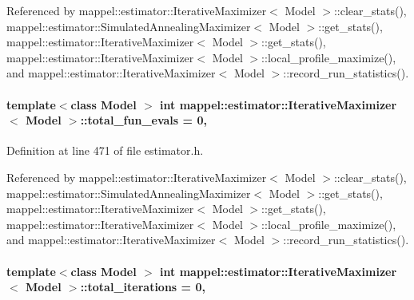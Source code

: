 Referenced by mappel\+::estimator\+::\+Iterative\+Maximizer$<$ Model $>$\+::clear\+\_\+stats(), mappel\+::estimator\+::\+Simulated\+Annealing\+Maximizer$<$ Model $>$\+::get\+\_\+stats(), mappel\+::estimator\+::\+Iterative\+Maximizer$<$ Model $>$\+::get\+\_\+stats(), mappel\+::estimator\+::\+Iterative\+Maximizer$<$ Model $>$\+::local\+\_\+profile\+\_\+maximize(), and mappel\+::estimator\+::\+Iterative\+Maximizer$<$ Model $>$\+::record\+\_\+run\+\_\+statistics().

\paragraph[{\texorpdfstring{total\+\_\+fun\+\_\+evals}{total_fun_evals}}]{\setlength{\rightskip}{0pt plus 5cm}template$<$class Model $>$ int {\bf mappel\+::estimator\+::\+Iterative\+Maximizer}$<$ Model $>$\+::total\+\_\+fun\+\_\+evals = 0\hspace{0.3cm}{\ttfamily [protected]}, {\ttfamily [inherited]}}\hypertarget{classmappel_1_1estimator_1_1IterativeMaximizer_aa4f49112ff3b145fa1096a7ac4d48af7}{}\label{classmappel_1_1estimator_1_1IterativeMaximizer_aa4f49112ff3b145fa1096a7ac4d48af7}


Definition at line 471 of file estimator.\+h.



Referenced by mappel\+::estimator\+::\+Iterative\+Maximizer$<$ Model $>$\+::clear\+\_\+stats(), mappel\+::estimator\+::\+Simulated\+Annealing\+Maximizer$<$ Model $>$\+::get\+\_\+stats(), mappel\+::estimator\+::\+Iterative\+Maximizer$<$ Model $>$\+::get\+\_\+stats(), mappel\+::estimator\+::\+Iterative\+Maximizer$<$ Model $>$\+::local\+\_\+profile\+\_\+maximize(), and mappel\+::estimator\+::\+Iterative\+Maximizer$<$ Model $>$\+::record\+\_\+run\+\_\+statistics().

\paragraph[{\texorpdfstring{total\+\_\+iterations}{total_iterations}}]{\setlength{\rightskip}{0pt plus 5cm}template$<$class Model $>$ int {\bf mappel\+::estimator\+::\+Iterative\+Maximizer}$<$ Model $>$\+::total\+\_\+iterations = 0\hspace{0.3cm}{\ttfamily [protected]}, {\ttfamily [inherited]}}\hypertarget{classmappel_1_1estimator_1_1IterativeMaximizer_a14a3683e595e1db79b9cbc49b0d8688e}{}\label{classmappel_1_1estimator_1_1IterativeMaximizer_a14a3683e595e1db79b9cbc49b0d8688e}


